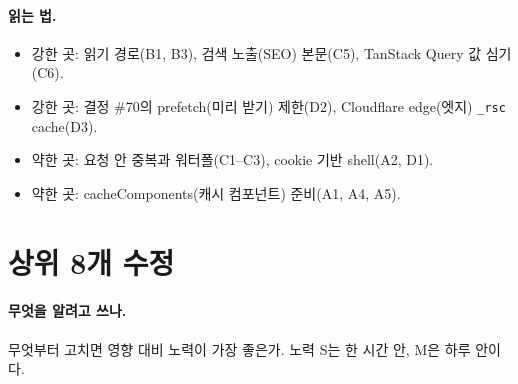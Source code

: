 \paragraph{읽는 법.}
\begin{itemize}[nosep]
  \item 강한 곳: 읽기 경로(B1, B3), 검색 노출(SEO) 본문(C5), TanStack Query 값 심기(C6).
  \item 강한 곳: 결정 \#70의 prefetch(미리 받기) 제한(D2), Cloudflare edge(엣지) \texttt{\_rsc} cache(D3).
  \item 약한 곳: 요청 안 중복과 워터폴(C1--C3), cookie 기반 shell(A2, D1).
  \item 약한 곳: cacheComponents(캐시 컴포넌트) 준비(A1, A4, A5).
\end{itemize}

\section{상위 8개 수정}\label{sec:ov-top8}

\paragraph{무엇을 알려고 쓰나.}
무엇부터 고치면 영향 대비 노력이 가장 좋은가.
노력 S는 한 시간 안, M은 하루 안이다.

